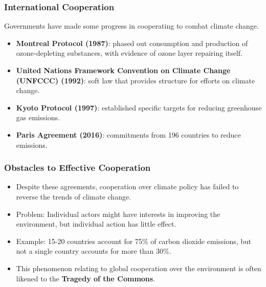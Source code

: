 \documentclass{beamer}
\begin{document}
\begin{frame} 
	\frametitle{\LARGE{International Cooperation}}
	Governments have made some progress in cooperating to combat climate change.
	\begin{itemize}
		
		\item \textbf{Montreal Protocol (1987)}: phased out consumption and production of ozone-depleting substances, with evidence of ozone layer repairing itself. \pause 
		
		\item \textbf{United Nations Framework Convention on Climate Change (UNFCCC) (1992)}: soft law that provides structure for efforts on climate change. \pause
		
		\item \textbf{Kyoto Protocol (1997)}: established specific targets for reducing greenhouse gas emissions. \pause
		
		\item \textbf{Paris Agreement (2016)}: commitments from 196 countries to reduce emissions.
		
	\end{itemize}
\end{frame}

\begin{frame} 
	\frametitle{\LARGE{Obstacles to Effective Cooperation}}
	\begin{itemize}
		\item Despite these agreements, cooperation over climate policy has failed to reverse the trends of climate change. \pause
		
		\item Problem: Individual actors might have interests in improving the environment, but individual action has little effect. \pause
		
		\item Example: 15-20 countries account for 75\% of carbon dioxide emissions, but not a single country accounts for more than 30\%. \pause 
		
		\item This phenomenon relating to global cooperation over the environment is often likened to the \textbf{Tragedy of the Commons}.
		
	\end{itemize}
\end{frame}
\end{document}
